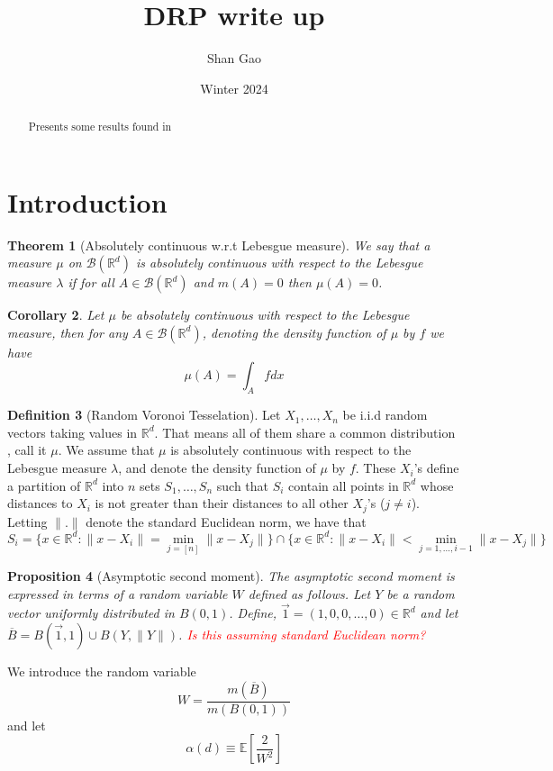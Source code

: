 \documentclass[12pt]{article}
\title{DRP write up}
\author{Shan Gao}
\date{Winter 2024}  %
\newtheorem{thm}{Theorem}
\newtheorem{cor}[thm]{Corollary}
\newtheorem{prop}[thm]{Proposition}
\theoremstyle{definition}
\newtheorem{defn}[thm]{Definition}
\theoremstyle{remark}
\begin{document}
\maketitle
\begin{abstract}
    Presents some results found in \cite{devroye2015measure}
\end{abstract}

\section{Introduction}
\begin{thm}[Absolutely continuous w.r.t Lebesgue measure]
    We say that a measure $\mu$ on $\mathcal{B}(\mathbb{R}^d)$ is absolutely continuous with respect to the Lebesgue measure $\lambda$ if for all $A \in \mathcal{B}(\mathbb{R}^d)$ and $m(A) = 0$ then $\mu(A) =0$. 
\end{thm}
\begin{cor}
    Let $\mu$ be absolutely continuous with respect to the Lebesgue measure, then for any $A \in \mathcal{B}(\mathbb{R}^d)$, denoting the density function of $\mu$ by $f$ we have 
    $$
        \mu(A) = \int_A f dx
    $$
\end{cor}
\begin{defn}[Random Voronoi Tesselation]
        Let $X_1,\ldots,X_n$ be i.i.d random vectors taking values in $\mathbb{R}^d$. That means all of them share a common distribution , call it $\mu$. We assume that $\mu$ is absolutely continuous with respect to the Lebesgue measure $\lambda$, and denote the density function of $\mu$ by $f$. These $X_i$'s define a partition of $\mathbb{R}^d$ into $n$ sets $S_1,\ldots,S_n$ such that $S_i$ contain all points in $\mathbb{R}^d$ whose distances to $X_i$ is not greater than their distances to all other $X_j$'s ($ j \neq i $). Letting $\|.\|$ denote the standard Euclidean norm, we have that 
        $$ S_i = \{x \in \mathbb{R}^d \colon \|x - X_i\| = \min_{j = [n]} \|x - X_j\| \}   \cap \{x \in \mathbb{R}^d \colon \|x - X_i\| < \min_{j = 1,\ldots,i-1} \|x - X_j\|\}$$
\end{defn}

\begin{prop}[Asymptotic second moment]
	The asymptotic second moment is expressed in terms of a random variable $W$ defined as follows. Let $Y$ be a random vector uniformly distributed in $B(0,1)$. Define, $\vec{1} = (1,0,0,\ldots,0) \in \mathbb{R}^d$ and let $\overline{B} = B(\vec{1},1)\cup B(Y, \|Y\|)$.  \textcolor{red}{Is this assuming standard Euclidean norm?}	
	
\end{prop}
We introduce the random variable
$$
		W = \frac{m(\overline{B})}{m(B(0,1))}
$$
and let
$$
	\alpha(d) \equiv \mathbb{E}\left[ \frac{2}{W^2} \right]
$$
\end{document}
